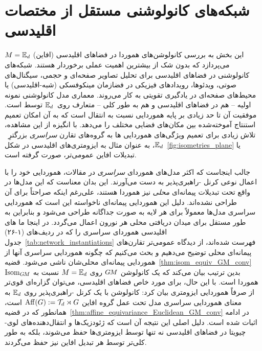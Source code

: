 

\section{شبکه‌های کانولوشنی مستقل از مختصات اقلیدسی}
\label{sec:instantiations_euclidean}

این بخش به بررسی کانولوشن‌های هموردا در فضاهای اقلیدسی (افاین) $M = \mathbb{E}_d$ می‌پردازد که بدون شک از بیشترین اهمیت عملی برخوردار هستند.
شبکه‌های کانولوشنی در فضاهای اقلیدسی برای تحلیل تصاویر صفحه‌ای و حجمی، سیگنال‌های صوتی، ویدئوها، رویدادهای فیزیکی در فضازمان مینکوفسکی (شبه-اقلیدسی) یا محیط‌های صفحه‌ای در یادگیری تقویتی به کار می‌روند.
معماری مدل کانولوشنی نمونه اولیه -- هم در فضاهای اقلیدسی و هم به طور کلی -- \CNN متعارف روی~$\mathbb{E}_d$ توسط \citet{LeCun1990CNNs} است.
موفقیت آن تا حد زیادی بر پایه هموردایی نسبت به انتقال است که به آن امکان تعمیم استنتاج آموخته‌شده بین مکان‌های فضایی مختلف را می‌دهد.
با انگیزه از این مشاهده، تلاش زیادی برای تعمیم ویژگی‌های هموردایی \CNN ها به گروه‌های تقارن \emph{سراسری} بزرگترِ~$\mathbb{E}_d$، به عنوان مثال به ایزومتری‌های اقلیدسی در شکل~\ref{fig:isometries_plane} یا تبدیلات افاین عمومی‌تر، صورت گرفته است.


جالب اینجاست که اکثر مدل‌های هموردای \emph{سراسری} در مقالات، هموردایی خود را با اعمال نوعی کرنل -راهبری‌پذیر به دست می‌آورند.
این بدان معناست که این مدل‌ها در واقع تحت تبدیلات پیمانه‌ای \emph{محلی} نیز هموردا هستند، علی‌رغم اینکه صراحتاً برای آن طراحی نشده‌اند.
دلیل این هموردایی پیمانه‌ای ناخواسته این است که هموردایی سراسری مدل‌ها معمولاً برای هر لایه به صورت جداگانه طراحی می‌شود و بنابراین به طور مستقل برای میدان دریافتی محلی هر نورون اعمال می‌گردد.
در اینجا ما \CNN های اقلیدسی هموردای سراسری را که در ردیف‌های (۱-۲۶) جدول~\ref{tab:network_instantiations} فهرست شده‌اند، از دیدگاه عمومی‌تر تقارن‌های پیمانه‌ای محلی توضیح می‌دهیم و بحث می‌کنیم که چگونه هموردایی سراسری آنها از هموردایی پیمانه‌ای محلی‌شان ناشی می‌شود.
قضیه~\ref{thm:isom_equiv_GM_conv} بدین ترتیب بیان می‌کند که یک کانولوشن $G\mkern-1.4muM$ روی $M = \mathbb{E}_d$ نسبت به $\operatorname{Isom}_{G\mkern-1.4muM}$ هموردا است.
با این حال، برای مورد خاص فضاهای اقلیدسی، می‌توان گزاره‌ای قوی‌تر از صرفاً هموردایی ایزومتری بیان کرد:
کانولوشن با یک کرنل -راهبری‌پذیر روی $\mathbb{E}_d$ به معنای هموردایی سراسری مدل تحت عمل گروه افاین $\operatorname{Aff}(G) := \mathcal{T}_d \rtimes G$ است، همانطور که در قضیه~\ref{thm:affine_equivariance_Euclidean_GM_conv} در ادامه اثبات شده است.
دلیل اصلی این نتیجه آن است که ژئودزیک‌ها و انتقال‌دهنده‌های لوی-چیویتا در فضاهای اقلیدسی نه تنها توسط ایزومتری‌ها حفظ می‌شوند، بلکه به طور کلی‌تر توسط هر تبدیل افاین نیز حفظ می‌گردند.

